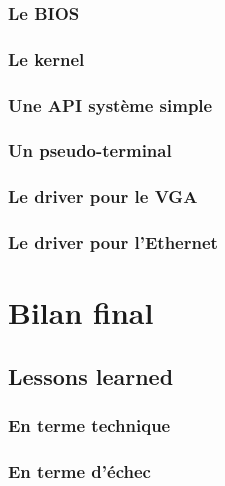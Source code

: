 \documentclass[a4paper]{report}
\begin{document}
\subsection{Le BIOS}
 \newpage

\subsection{Le kernel}
 \newpage

\subsection{Une API système simple}
 \newpage

\subsection{Un pseudo-terminal}
 \newpage

\subsection{Le driver pour le VGA}
 \newpage

\subsection{Le driver pour l'Ethernet}
 \newpage

\chapter*{Bilan final}

\section{Lessons learned}

\subsection{En terme technique}


\subsection{En terme d'échec}

\end{document}
